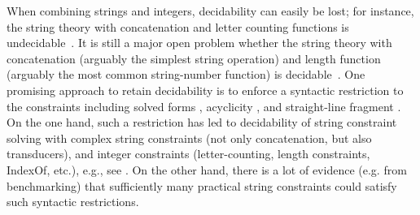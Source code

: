 

When combining strings and integers, decidability can easily be lost; 
 for instance, the string theory with concatenation and letter counting
functions is undecidable~\cite{buchi,Manea-RP}.
It is still a major open problem whether the string theory with concatenation (arguably the simplest string operation) and length function 
(arguably the most common string-number function) is 
decidable~\cite{Vijay-length}. 
One promising approach to retain decidability is to enforce a syntactic
restriction to the constraints including solved forms
\cite{Vijay-length}, acyclicity \cite{BFL13,Abdulla14,AbdullaA+19}, and 
straight-line fragment \cite{LB16,CCH+18,CHL+19,HJLRV18}. On the one hand,
such a restriction has led to decidability of string constraint solving with 
complex string
constraints (not only concatenation, but also transducers), and integer
constraints (letter-counting, length constraints, IndexOf, etc.), e.g., see
\cite{LB16}. On the other hand, there is a lot of evidence (e.g. from 
benchmarking) that sufficiently many practical string constraints could satisfy 
such syntactic restrictions.
%
%

